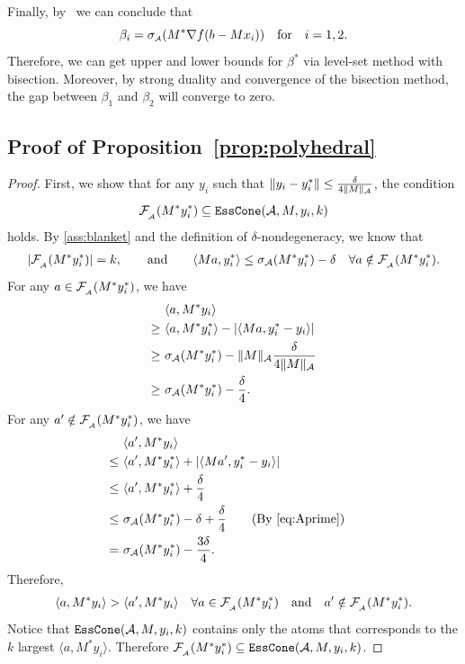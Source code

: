 Finally, by~\cite[Theorem~5.1]{fan2019alignment} we can conclude that 
\[\beta_i = \sigma_{\scriptscriptstyle\mathcal{A}}(M^*\nabla f(b - Mx_i)) \hbox{\quad for\quad} i = 1,2.\]
Therefore, we can get upper and lower bounds for $\beta^*$ via level-set method with bisection. Moreover, by strong duality and convergence of the bisection method, the gap between $\beta_1$ and $\beta_2$ will converge to zero. 

\subsection{Proof of Proposition~\ref{prop:polyhedral}}
\label{app:prop_proof}
\begin{proof}
  First, we show that for any $y_i$ such that $\| y_i - y_i^* \| \leq \frac{\delta}{4\| M \|_{\mathcal{A}}}$, the condition 
  \[\mathcal{F}_{\scriptscriptstyle _{\scriptscriptstyle\mathcal{A}}}( M^* y_i^*) \subseteq \texttt{EssCone}(\mathcal{A}, M, y_i, k)\]
  holds. By \autoref{ass:blanket} and the definition of $\delta$-nondegeneracy, we know that 
  \begin{align}
      |  \mathcal{F}_{\scriptscriptstyle _{\scriptscriptstyle\mathcal{A}}}( M^* y_i^*) | = k, \quad \hbox{\quad and\quad} \quad \langle Ma, y_i^* \rangle \leq \sigma_{\mathcal{A}}( M^* y_i^* ) - \delta \quad \forall a \notin \mathcal{F}_{\scriptscriptstyle _{\scriptscriptstyle\mathcal{A}}}( M^* y_i^*). \label{eq:Aprime}
  \end{align}
  For any $a \in \mathcal{F}_{\scriptscriptstyle _{\scriptscriptstyle\mathcal{A}}}( M^* y_i^*)$, we have
  \begin{align*}
      & \langle a, M^* y_i \rangle \\
      \geq~& \langle a, M^* y_i^* \rangle - | \langle M a, y_i^* - y_i \rangle | \\
      \geq~& \sigma_{\mathcal{A}}( M^* y_i^* ) - \| M \|_{\mathcal{A}} \frac{\delta}{4\|M\|_{\mathcal{A}}} \\
      \geq~& \sigma_{\mathcal{A}}( M^* y_i^* ) - \frac{\delta}{4}.
  \end{align*}
  For any $a' \notin \mathcal{F}_{\scriptscriptstyle _{\scriptscriptstyle\mathcal{A}}}( M^* y_i^*)$, we have 
  \begin{align*}
      & \langle a', M^* y_i \rangle \\
      \leq~ & \langle a', M^* y_i^* \rangle + | \langle M a', y_i^* - y_i \rangle | \\
      \leq~ & \langle a', M^* y_i^* \rangle + \frac{\delta}{4} \\
      \leq~ & \sigma_{\Ascr}( M^* y_i^* ) - \delta + \frac{\delta}{4} \quad \text{(By \autoref{eq:Aprime})} \\
      =~& \sigma_{\Ascr}( M^* y_i^* ) - \frac{3\delta}{4}.
  \end{align*}
    Therefore, 
    \begin{align*}
        \langle a, M^* y_i \rangle > \langle a', M^* y_i \rangle  \quad \forall a \in \mathcal{F}_{\scriptscriptstyle _{\scriptscriptstyle\mathcal{A}}}( M^* y_i^*) \hbox{\quad and\quad} a' \notin \mathcal{F}_{\scriptscriptstyle _{\scriptscriptstyle\mathcal{A}}}( M^* y_i^*).
    \end{align*}
    Notice that $\texttt{EssCone}(\mathcal{A}, M, y_i, k)$ contains only the atoms that corresponds to the $k$ largest $\langle a, M^* y_i \rangle$. Therefore $\mathcal{F}_{\scriptscriptstyle _{\scriptscriptstyle\mathcal{A}}}( M^* y_i^*) \subseteq \texttt{EssCone}(\mathcal{A}, M, y_i, k)$.
    

\end{proof}
